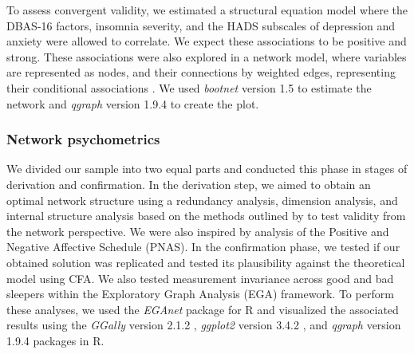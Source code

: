 \documentclass[
  12pt,
  twoside,
  openright,
  a4paper,
  chapter=TITLE,
  section=TITLE,
  brazil]{abntex2}
\begin{document}
To assess convergent validity, we estimated a structural equation model
where the DBAS-16 factors, insomnia severity, and the HADS subscales of
depression and anxiety were allowed to correlate. We expect these
associations to be positive and strong. These associations were also
explored in a network model, where variables are represented as nodes,
and their connections by weighted edges, representing their conditional
associations \autocite{borsboom2021}. We used \emph{bootnet} version 1.5
\autocite{R-bootnet} to estimate the network and \emph{qgraph} version
1.9.4 \autocite{R-qgraph} to create the plot.

\hypertarget{network-psychometrics}{%
\subsubsection{Network psychometrics}\label{network-psychometrics}}

We divided our sample into two equal parts and conducted this phase in
stages of derivation and confirmation. In the derivation step, we aimed
to obtain an optimal network structure using a redundancy analysis,
dimension analysis, and internal structure analysis based on the methods
outlined by \textcite{christensen2020b} to test validity from the
network perspective. We were also inspired by
\textcite{flores-kanter2021} analysis of the Positive and Negative
Affective Schedule (PNAS). In the confirmation phase, we tested if our
obtained solution was replicated and tested its plausibility against the
theoretical model using CFA. We also tested measurement invariance
across good and bad sleepers within the Exploratory Graph Analysis (EGA)
framework. To perform these analyses, we used the \emph{EGAnet}
\autocite{EGAnet} package for R and visualized the associated results
using the \emph{GGally} version 2.1.2 \autocite{R-GGally},
\emph{ggplot2} version 3.4.2 \autocite{R-ggplot2}, and \emph{qgraph}
version 1.9.4 \autocite{R-qgraph} packages in R.
\end{document}
